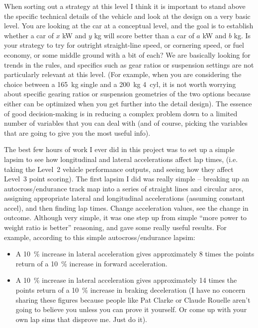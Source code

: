 \documentclass[10pt, a4paper, article, oneside, twocolumn, final]{memoir}
\begin{document}
When sorting out a strategy at this level I think it is important to stand above the specific technical details of the vehicle and look at the design on a very basic level. You are looking at the car at a  conceptual level, and the goal is to establish whether a car of $x$ \si{\kilo\watt} and $y$ \si{\kilogram} will score better than a car of $a$ \si{\kilo\watt} and $b$ \si{\kilogram}. Is your strategy to try for outright straight-line speed, or cornering speed, or fuel economy, or some middle ground with a bit of each? We are basically looking for trends in the rules, and specifics such as gear ratios or suspension settings are not particularly relevant at this level. (For example, when you are considering the choice between a \SI{165}{\kilogram} single and a \SI{200}{\kilogram} \SI{4}{cyl}, it is not worth worrying about specific gearing ratios or suspension geometries of the two options because either can be optimized when you get further into the detail design). The essence of good decision-making is in reducing a complex problem down to a limited number of variables that you can deal with (and of course, picking the variables that are going to give you the most useful info). 

The best few hours of work I ever did in this project was to set up a simple lapsim to see how longitudinal and lateral accelerations affect lap times, (i.e. taking the Level~2 vehicle performance outputs, and seeing how they affect Level~3 point scoring). The first lapsim I did was really simple -- breaking up an autocross/\allowbreak endurance track map into a series of straight lines and circular arcs, assigning appropriate lateral and longitudinal accelerations (assuming constant accel), and then finding lap times. Change acceleration values, see the change in outcome. Although very simple, it was one step up from simple “more power to weight ratio is better” reasoning, and gave some really useful results. For example, according to this simple autocross/\allowbreak endurance lapsim: 

\begin{itemize}
    \item A \SI{10}{\percent} increase in lateral acceleration gives approximately 8 times the points return of a \SI{10}{\percent} increase in forward acceleration. 
    \item A \SI{10}{\percent} increase in lateral acceleration gives approximately 14 times the points return of a \SI{10}{\percent} increase in braking deceleration (I have no concern sharing these figures because people like Pat Clarke or Claude Rouelle aren’t going to believe you unless you can prove it yourself. Or come up with your own lap sims that disprove me. Just do it). 
\end{itemize}
\end{document}
